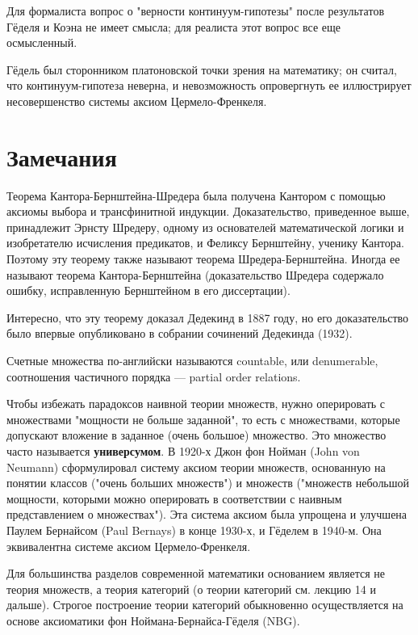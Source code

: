 \documentclass[12pt]{book}
\theoremstyle{upshape}
\theoremstyle{generic}
\theoremstyle{upshapenonumber}
\newcommand{\следствие}{%
     \refstepcounter{teorema}
     {\noindent\bf Следствие \thechapter.\arabic{teorema}:\ }}
\newcommand{\пример}{%
     \refstepcounter{teorema}
     {\noindent\bf Пример \thechapter.\arabic{teorema}:\ }}
\newcommand{\лемма}{%
     \refstepcounter{teorema}
     {\noindent\bf Лемма \thechapter.\arabic{teorema}:\ }}
\newcommand{\теорема}{%
     \refstepcounter{teorema}
     {\noindent\bf Теорема \thechapter.\arabic{teorema}:\ }}
\newcommand{\утверждение}{%
     \refstepcounter{teorema}
     {\noindent\bf Утверждение \thechapter.\arabic{teorema}:\ }}
\def\бф{\bf}
\begin{document}
Для формалиста вопрос о "верности континуум-гипотезы"
после результатов Гёделя и Коэна не имеет смысла; 
для реалиста этот вопрос все еще осмысленный.

Гёдель был сторонником платоновской точки зрения
на математику; он считал, что континуум-гипотеза
неверна, и невозможность опровергнуть ее иллюстрирует
несовершенство системы аксиом Цермело-Френкеля.



\section{Замечания}

Теорема Кантора-Бернштейна-Шредера была
получена Кантором с помощью аксиомы выбора
и трансфинитной индукции. Доказательство,
приведенное выше, принадлежит Эрнсту 
Шредеру, одному из основателей математической
логики и изобретателю исчисления предикатов, 
и  Феликсу Бернштейну, ученику Кантора.
Поэтому эту теорему также называют теорема
Шредера-Бернштейна. Иногда ее называют
теорема Кантора-Бернштейна (доказательство
Шредера содержало ошибку, исправленную
Бернштейном в его диссертации). 

Интересно, что эту теорему
доказал Дедекинд в 1887 году, но его доказательство
было впервые опубликовано в собрании сочинений
Дедекинда (1932). 

Счетные множества по-английски называются
countable, или denumerable, соотношения 
частичного порядка --- partial order relations.

Чтобы избежать парадоксов наивной теории
множеств, нужно оперировать с множествами
"мощности не больше заданной", то есть
с множествами, которые допускают вложение
в заданное (очень большое) множество.
Это множество часто называется 
{\бф универсумом}. В 1920-х 
Джон фон Нойман (John von Neumann) 
сформулировал систему аксиом теории множеств,
основанную на понятии классов ("очень
больших множеств") и множеств 
("множеств небольшой мощности,
которыми можно оперировать в соответствии
с наивным представлением о множествах").
Эта система аксиом была упрощена и улучшена 
Паулем Бернайсом (Paul Bernays) в конце 1930-х,
и Гёделем в 1940-м. Она эквивалентна 
системе аксиом Цермело-Френкеля.

Для большинства
разделов современной математики
основанием является не теория множеств,
а теория категорий (о теории категорий
см. лекцию 14 и дальше).
Строгое построение теории 
категорий обыкновенно осуществляется 
на основе аксиоматики фон 
Ноймана-Бернайса-Гёделя
(NBG).
\end{document}
